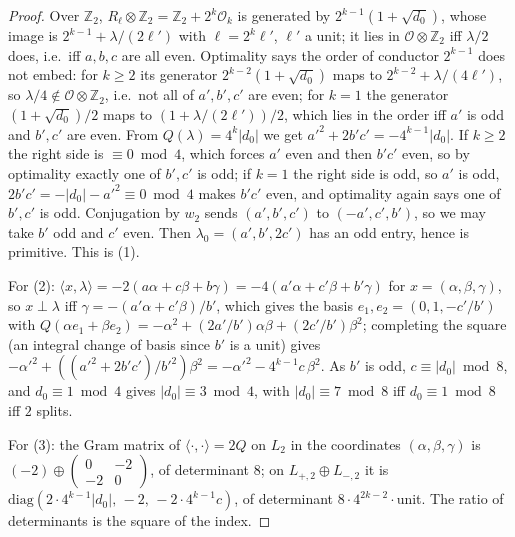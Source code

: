 \documentclass[11pt,reqno]{amsart}
\theoremstyle{plain}
\theoremstyle{definition}
\newcommand{\Z}{\mathbb{Z}}
\begin{document}
\begin{proof}
Over $\Z_2$, $R_\ell\otimes\Z_2=\Z_2+2^k\mathcal O_{k}$ is generated by $2^{k-1}(1+\sqrt{d_0})$, whose
image is $2^{k-1}+\lambda/(2\ell')$ with $\ell=2^k\ell'$, $\ell'$ a unit; it lies in $\mathcal O\otimes\Z_2$ iff
$\lambda/2$ does, i.e.\ iff $a,b,c$ are all even. Optimality says the order of conductor $2^{k-1}$
does not embed: for $k\ge2$ its generator $2^{k-2}(1+\sqrt{d_0})$ maps to $2^{k-2}+\lambda/(4\ell')$, so
$\lambda/4\notin\mathcal O\otimes\Z_2$, i.e.\ not all of $a',b',c'$ are even; for $k=1$ the generator
$(1+\sqrt{d_0})/2$ maps to $(1+\lambda/(2\ell'))/2$, which lies in the order iff $a'$ is odd and $b',c'$
are even. From $Q(\lambda)=4^k\lvert d_0\rvert$ we get $a'^2+2b'c'=-4^{k-1}\lvert d_0\rvert$. If
$k\ge2$ the right side is $\equiv0\bmod4$, which forces $a'$ even and then $b'c'$ even, so by
optimality exactly one of $b',c'$ is odd; if $k=1$ the right side is odd, so $a'$ is odd,
$2b'c'=-\lvert d_0\rvert-a'^2\equiv0\bmod4$ makes $b'c'$ even, and optimality again says one of
$b',c'$ is odd. Conjugation by $w_2$ sends $(a',b',c')$ to $(-a',c',b')$, so we may take $b'$ odd and
$c'$ even. Then $\lambda_0=(a',b',2c')$ has an odd entry, hence is primitive. This is (1).

For (2): $\langle x,\lambda\rangle=-2(a\alpha+c\beta+b\gamma)=-4(a'\alpha+c'\beta+b'\gamma)$ for
$x=(\alpha,\beta,\gamma)$, so $x\perp\lambda$ iff $\gamma=-(a'\alpha+c'\beta)/b'$, which gives the
basis $e_1,e_2=(0,1,-c'/b')$ with $Q(\alpha e_1+\beta e_2)=-\alpha^2+(2a'/b')\alpha\beta+(2c'/b')
\beta^2$; completing the square (an integral change of basis since $b'$ is a unit) gives $-\alpha'^2
+((a'^2+2b'c')/b'^2)\beta^2=-\alpha'^2-4^{k-1}c\,\beta^2$. As $b'$ is odd, $c\equiv\lvert d_0\rvert
\bmod8$, and $d_0\equiv1\bmod4$ gives $\lvert d_0\rvert\equiv3\bmod4$, with $\lvert d_0\rvert\equiv7
\bmod8$ iff $d_0\equiv1\bmod8$ iff $2$ splits.

For (3): the Gram matrix of $\langle\cdot,\cdot\rangle=2Q$ on $L_2$ in the coordinates $(\alpha,
\beta,\gamma)$ is $(-2)\oplus\begin{pmatrix}0&-2\\-2&0\end{pmatrix}$, of determinant $8$; on
$L_{+,2}\oplus L_{-,2}$ it is $\mathrm{diag}(2\cdot4^{k-1}\lvert d_0\rvert,\,-2,\,-2\cdot4^{k-1}c)$,
of determinant $8\cdot4^{2k-2}\cdot$unit. The ratio of determinants is the square of the index.


\end{proof}
\end{document}
